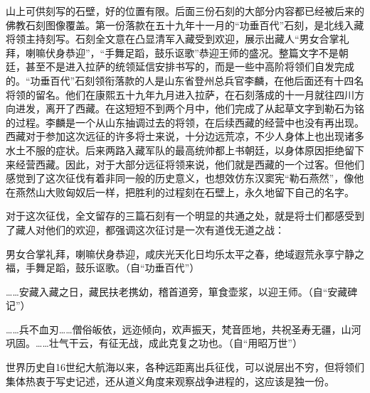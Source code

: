 



山上可供刻写的石壁，好的位置有限。后面三份石刻的大部分内容都已经被后来的佛教石刻图像覆盖。第一份落款在五十九年十一月的“功垂百代”石刻，是北线入藏将领主持刻写。石刻全文意在凸显清军入藏受到欢迎，展示出藏人“男女合掌礼拜，喇嘛伏身恭迎”，“手舞足蹈，鼓乐讴歌”恭迎王师的盛况。整篇文字不是朝廷，甚至不是进入拉萨的统领延信安排书写的，而是一些中高阶将领们自发完成的。“功垂百代”石刻领衔落款的人是山东省登州总兵官李麟，在他后面还有十四名将领的留名。他们在康熙五十九年九月进入拉萨，在石刻落成的十一月就往四川方向进发，离开了西藏。在这短短不到两个月中，他们完成了从起草文字到勒石为铭的过程。李麟是一个从山东抽调过去的将领，在后续西藏的经营中也没有再出现。西藏对于参加这次远征的许多将士来说，十分边远荒凉，不少人身体上也出现诸多水土不服的症状。后来两路入藏军队的最高统帅都上书朝廷，以身体原因拒绝留下来经营西藏。因此，对于大部分远征将领来说，他们就是西藏的一个过客。但他们感觉到了这次征伐有着非同一般的历史意义，也想效仿东汉窦宪“勒石燕然”，像他在燕然山大败匈奴后一样，把胜利的过程刻在石壁上，永久地留下自己的名字。



对于这次征伐，全文留存的三篇石刻有一个明显的共通之处，就是将士们都感受到了藏人对他们的欢迎，都强调这次征讨是一次有道伐无道之战：



\begin{bookquote}男女合掌礼拜，喇嘛伏身恭迎，咸庆光天化日均乐太平之春，绝域遐荒永享宁静之福，手舞足蹈，鼓乐讴歌。（自“功垂百代”）\end{bookquote}


\begin{bookquote}……安藏入藏之日，藏民扶老携幼，稽首道旁，箪食壶浆，以迎王师。（自“安藏碑记”）\end{bookquote}


\begin{bookquote}……兵不血刃……僧俗皈依，远迩倾向，欢声振天，梵音匝地，共祝圣寿无疆，山河巩固。……壮气干云，有征无战，成此克复之功也。（自“用昭万世”）\end{bookquote}


世界历史自16世纪大航海以来，各种远距离出兵征伐，可以说层出不穷，但将领们集体热衷于写史记述，还从道义角度来观察战争进程的，这应该是独一份。


